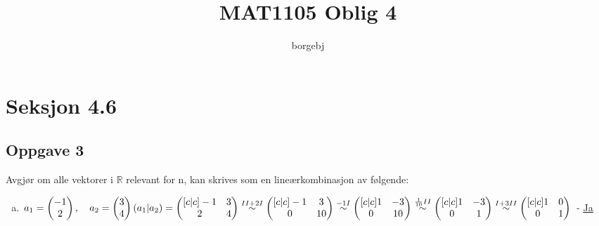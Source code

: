 \documentclass{article}
\title{MAT1105 Oblig 4}
\author{borgebj}
\date{}
\newcommand{\vect}[1]{\begin{pmatrix} #1 \end{pmatrix}}
\newcommand{\uu}[1]{\underline{\underline{#1}}}
\newcommand{\eqto}[1]{\overset{#1}{\sim}}
\newcommand{\eqqto}[1]{\overset{\substack{#1}}{\sim}}
\begin{document}
\maketitle

\section*{Seksjon 4.6}

\subsection*{Oppgave 3}
Avgjør om alle vektorer i $\mathbb{R}$ relevant for n, kan skrives som en lineærkombinasjon av følgende:
\begin{enumerate}[a)]
    \item \(a_1=\vect{-1\\2}, \quad a_2=\vect{3\\4} \\\\\\ 
    (a_1|a_2) = 
    \begin{pmatrix}[c|c]
        -1&3\\
        2&4
    \end{pmatrix}
    \eqqto{II+2I\\}
    \begin{pmatrix}[c|c]
        -1&3\\
        0&10
    \end{pmatrix}
    \eqto{-1I}
    \begin{pmatrix}[c|c]
        1&-3\\
        0&10
    \end{pmatrix}
    \eqqto{\frac{1}{10}II}
    \begin{pmatrix}[c|c]
        1&-3\\
        0&1
    \end{pmatrix}
    \eqqto{I+3II}
    \begin{pmatrix}[c|c]
        1&0\\
        0&1
    \end{pmatrix}
    \\\\\)
    - \uu{Ja}
    
\end{enumerate}

\vspace{4em}
\end{document}
